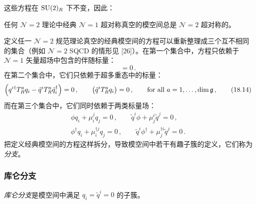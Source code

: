 这些方程在 $\operatorname{SU}(2)_R$ 下不变，因此：

\begin{proposition}[18.10]
任何 $\mathcal N=2$ 理论中经典 $\mathcal N=1$ 超对称真空的模空间总是 $\mathcal N=2$ 超对称的。
\end{proposition}

定义任一 $\mathcal N=2$ 规范理论真空的经典模空间的方程可以重新整理成三个互不相同的集合（例如 $\mathcal N=2$ SQCD 的情形见 [26]）。在第一个集合中，方程只依赖于 $\mathcal N=1$ 矢量超场中包含的伴随标量：
\begin{equation}
[\phi^\dagger,\phi]=0\,. \tag{18.13}
\end{equation}
在第二个集合中，它们只依赖于超多重态中的标量：
\begin{equation}
\left(q^{i\dagger}T_R^a q_i-\tilde q^iT_R^a\tilde q_i^\dagger\right)=0\,,\qquad
\left(\tilde q^iT_R^a q_i\right)=0\,,\qquad
\text{for all }a=1,\dots,\dim\mathfrak{g}\,, \tag{18.14}
\end{equation}
而在第三个集合中，它们同时依赖于两类标量场：
\begin{equation}
\begin{gathered}
\phi q_i+\mu_i^j q_j=0\,,\qquad \tilde q^i\phi+\mu_j^i\tilde q^j=0\,,\\
\phi^\dagger q_i+\mu_i^{\dagger j}q_j=0\,,\qquad \tilde q^i\phi^\dagger+\mu_j^{\dagger i}\tilde q^j=0\,.
\end{gathered}
\tag{18.15}
\end{equation}
把定义经典模空间的方程这样拆分，导致模空间中若干有趣子簇的定义，它们称为\emph{分支}。


\subsubsection*{库仑分支}

\begin{definition}[18.11]
\emph{库仑分支}是模空间中满足 $q_i=\tilde q^i=0$ 的子簇。
\end{definition}

